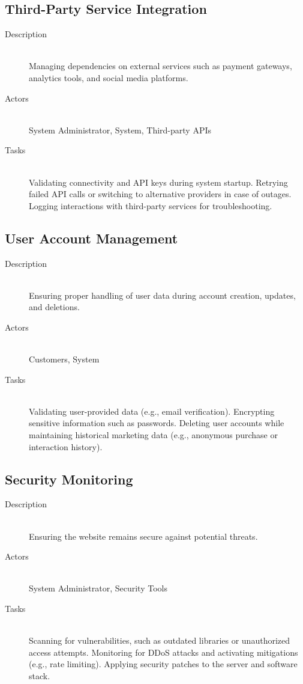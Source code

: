 \documentclass[twoside,a4paper,journal]{IEEEtran}
\begin{document}
\subsection{Third-Party Service Integration}
\begin{description}
  \item[Description] \hfill \\
    Managing dependencies on external services such as payment gateways,
    analytics tools, and social media platforms.
  \item[Actors] \hfill \\
    System Administrator, System, Third-party APIs
  \item[Tasks] \hfill \\
    Validating connectivity and API keys during system startup.
    Retrying failed API calls or switching to alternative providers in case of
    outages.
    Logging interactions with third-party services for troubleshooting.
\end{description}

\subsection{User Account Management}
\begin{description}
  \item[Description] \hfill \\
    Ensuring proper handling of user data during account creation, updates, and
    deletions.
  \item[Actors] \hfill \\
    Customers, System
  \item[Tasks] \hfill \\
    Validating user-provided data (e.g., email verification).
    Encrypting sensitive information such as passwords.
    Deleting user accounts while maintaining historical marketing data
    (e.g., anonymous purchase or interaction history).
\end{description}

\subsection{Security Monitoring}
\begin{description}
  \item[Description] \hfill \\
    Ensuring the website remains secure against potential threats.
  \item[Actors] \hfill \\
    System Administrator, Security Tools
  \item[Tasks] \hfill \\
    Scanning for vulnerabilities, such as outdated libraries or unauthorized
    access attempts.
    Monitoring for DDoS attacks and activating mitigations
    (e.g., rate limiting).
    Applying security patches to the server and software stack.
\end{description}
\end{document}

